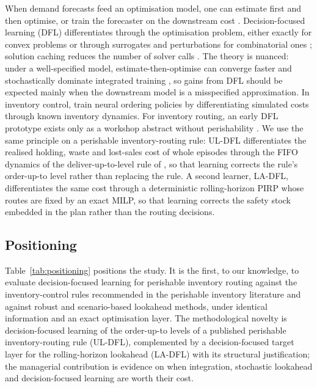 When demand forecasts feed an optimisation model, one can estimate first and then optimise, or train the forecaster on the downstream cost \citep{elmachtoub2022smart,sadana2025survey}. Decision-focused learning (DFL) differentiates through the optimisation problem, either exactly for convex problems \citep{amos2017optnet,donti2017task} or through surrogates and perturbations for combinatorial ones \citep{berthet2020learning,mandi2024decision,tang2024pyepo}; solution caching reduces the number of solver calls \citep{mulamba2021contrastive}. The theory is nuanced: under a well-specified model, estimate-then-optimise can converge faster and stochastically dominate integrated training \citep{hu2022fast,elmachtoub2023estimate}, so gains from DFL should be expected mainly when the downstream model is a misspecified approximation. In inventory control, \citet{alvo2023neural} train neural ordering policies by differentiating simulated costs through known inventory dynamics. For inventory routing, an early DFL prototype exists only as a workshop abstract without perishability \citep{islam2023optimizing}. We use the same principle on a perishable inventory-routing rule: UL-DFL differentiates the realised holding, waste and lost-sales cost of whole episodes through the FIFO dynamics of the deliver-up-to-level rule of \citet{crama2018stochastic}, so that learning corrects the rule's order-up-to level rather than replacing the rule. A second learner, LA-DFL, differentiates the same cost through a deterministic rolling-horizon PIRP whose routes are fixed by an exact MILP, so that learning corrects the safety stock embedded in the plan rather than the routing decisions.

\subsection{Positioning}

Table~\ref{tab:positioning} positions the study. It is the first, to our knowledge, to evaluate decision-focused learning for perishable inventory routing against the inventory-control rules recommended in the perishable inventory literature and against robust and scenario-based lookahead methods, under identical information and an exact optimisation layer. The methodological novelty is decision-focused learning of the order-up-to levels of a published perishable inventory-routing rule (UL-DFL), complemented by a decision-focused target layer for the rolling-horizon lookahead (LA-DFL) with its structural justification; the managerial contribution is evidence on when integration, stochastic lookahead and decision-focused learning are worth their cost.

